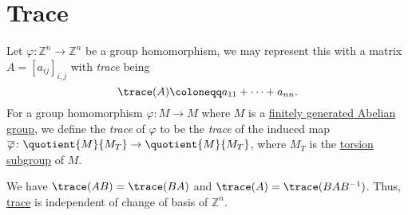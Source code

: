 \section{Trace}
\begin{definition}[Trace]\label{def:trace}
	Let \(\varphi \colon \mathbb{Z}^n \to \mathbb{Z}^n\) be a group homomorphism, we may represent this with a matrix
	\(A = \left[a_{ij}\right]_{i, j}\) with \emph{trace} being
	\[
		\trace(A) \coloneqq a_{11} + \dots + a_{nn}.
	\]
	For a group homomorphism \(\varphi \colon M \to M\) where \(M\) is a \hyperref[apx:ssc:finitely-generated-Abelian-group]{finitely generated Abelian group}, we define the \emph{trace} of \(\varphi\) to be the \emph{trace} of the induced map \(\overline{\varphi} \colon \quotient{M}{M_T} \to \quotient{M}{M_T}\),
	where \(M_T\) is the \hyperref[def:torsion-subgroup]{torsion subgroup} of \(M\).
\end{definition}

\begin{exercise}
	We have \(\trace(AB) = \trace(BA)\) and \(\trace(A) = \trace(BAB^{-1})\). Thus, \hyperref[def:trace]{trace} is independent of change of basis of \(\mathbb{Z} ^n\).
\end{exercise}